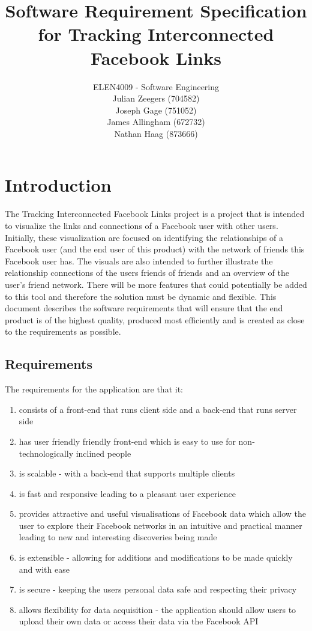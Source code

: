 \documentclass[10pt,onecolumn]{article}
\title{\vspace{-4.2cm}Software Requirement Specification for Tracking Interconnected Facebook Links }
\author{ ELEN4009 - Software Engineering\\ Julian Zeegers (704582) \\  Joseph Gage (751052)\\ James Allingham (672732) \\ Nathan Haag (873666)}
\begin{document}
\date{\vspace{-5ex}}
\maketitle
\pagestyle{plain}
\setcounter{page}{1}



\section{Introduction}
The Tracking Interconnected Facebook Links project is a project that  is intended to visualize the links and connections of a Facebook user with other users. Initially, these visualization are focused on identifying the relationships of a Facebook user (and the end user of this product) with the network of friends this Facebook user has. The visuals are also intended to further illustrate the relationship connections of the users friends of friends and an overview of the user's friend network. There will be more features that could potentially be added to this tool and therefore the solution must be dynamic and flexible. This document describes the software requirements that will ensure that the end product is of the highest quality, produced most efficiently and is created as close to the requirements as possible.

\subsection{Requirements}

The requirements for the application are that it:
\begin{enumerate}
\item consists of a front-end that runs client side and a back-end that runs server side 
\item has user friendly friendly front-end which is easy to use for non-technologically inclined people
\item is scalable - with a back-end that supports multiple clients
\item is fast and responsive leading to a pleasant user experience
\item provides attractive and useful visualisations of Facebook data which allow the user to explore their Facebook networks in an intuitive and practical manner leading to new and interesting discoveries being made
\item is extensible - allowing for additions and modifications to be made quickly and with ease
\item is secure - keeping the users personal data safe and respecting their privacy
\item allows flexibility for data acquisition - the application should allow users to upload their own data or access their data via the Facebook API
\end{enumerate}
\end{document}
